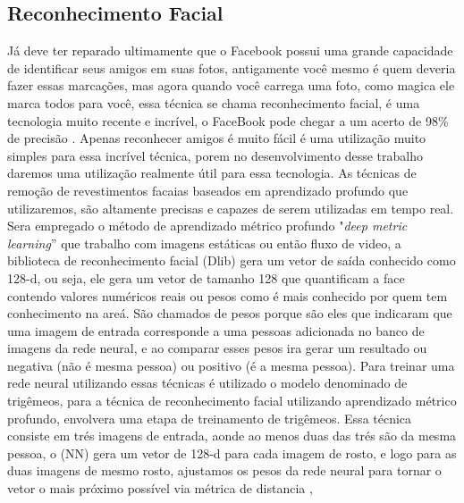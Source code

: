 \subsection{Reconhecimento Facial}
Já deve ter reparado ultimamente que o  Facebook possui uma grande capacidade de identificar seus amigos em suas fotos, antigamente você mesmo é quem deveria fazer essas marcações, mas agora quando você carrega uma foto, como magica ele marca todos para você, essa técnica se chama reconhecimento facial, é uma tecnologia muito recente e incrível, o FaceBook pode chegar a um acerto de 98\% de precisão \cite{adamgeitgey}.
Apenas reconhecer amigos é muito fácil é uma utilização muito simples para essa incrível técnica, porem no desenvolvimento desse trabalho daremos uma utilização realmente útil para essa tecnologia.
As técnicas de remoção de revestimentos facaias baseados em aprendizado profundo que utilizaremos, são altamente precisas e capazes de serem utilizadas em tempo real. Sera empregado o método de aprendizado métrico profundo "\textit{deep metric learning}” que trabalho com imagens estáticas ou então fluxo de video, a biblioteca de reconhecimento facial (Dlib) gera um vetor de saída conhecido como 128-d, ou seja, ele gera um vetor de tamanho 128 que quantificam a face contendo valores numéricos reais ou pesos como é mais conhecido por quem tem conhecimento na areá. São chamados de pesos porque são eles que indicaram que uma imagem de entrada corresponde a uma pessoas adicionada no banco de imagens da rede neural, e ao comparar esses pesos ira gerar um resultado ou negativa (não é mesma pessoa) ou positivo (é a mesma pessoa). Para treinar uma rede neural utilizando essas técnicas é utilizado o modelo denominado de trigêmeos, para a técnica de reconhecimento facial utilizando aprendizado métrico profundo, envolvera uma etapa de treinamento de trigêmeos. Essa técnica consiste em trés imagens de entrada, aonde ao menos duas das trés são da mesma pessoa, o (NN) gera um vetor de 128-d para cada imagem de rosto, e logo para as duas imagens de mesmo rosto, ajustamos os pesos da rede neural para tornar o vetor o mais próximo possível via métrica de distancia \cite{adriamRF},

